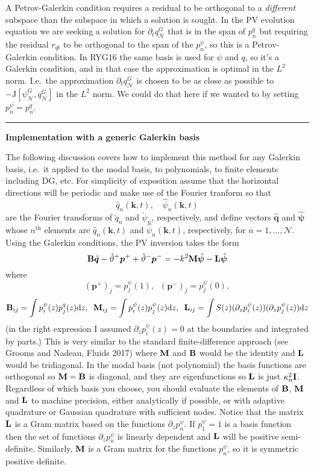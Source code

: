 \documentclass[10pt]{article}
\newcommand{\pd}[1]{\partial_{#1}}
\newcommand{\sN}{\mathcal{N}}
\newcommand{\mat}[1]{\text{\bf #1}}
\begin{document}
A Petrov-Galerkin condition requires a residual to be orthogonal to a {\it different} subspace than the subspace in which a solution is sought.
In the PV evolution equation we are seeking a solution for $\pd{t}q_\sN^G$ that is in the span of $p_n^q$ but requiring the residual $r_{qt}$ to be orthogonal to the span of the $p_n^\psi$, so this is a Petrov-Galerkin condition.
In RYG16 the same basis is used for $\psi$ and $q$, so it's a Galerkin condition, and in that case the approximation is optimal in the $L^2$ norm.
I.e.~the approximation $\pd{t}q_\sN^G$ is chosen to be as close as possible to $-\text{J}[\psi_\sN^G,q_\sN^G]$ in the $L^2$ norm.
We could do that here if we wanted to by setting $p_n^\psi=p_n^q$.

\clearpage
\hrule
\begin{center}{\bf Implementation with a generic Galerkin basis}\end{center}
The following discussion covers how to implement this method for any Galerkin basis, i.e.~it applied to the modal basis, to polynomials, to finite elements including DG, etc.
For simplicity of exposition assume that the horizontal directions will be periodic and make use of the Fourier tranform so that
\[\hat{q}_n(\bm{k},t),\quad\hat{\psi}_n(\bm{k},t)\]
are the Fourier transforms of $\breve q_n$ and $\breve\psi_n$, respectively, and define vectors $\hat{\bm{q}}$ and $\hat{\bm{\psi}}$ whose $n^\text{th}$ elements are $\hat{q}_n(\bm{k},t)$ and $\hat{\psi}_n(\bm{k},t)$, respectively, for $n=1,\ldots,\sN$.
Using the Galerkin conditions, the PV inversion takes the form
\[\mat{B}\hat{\bm{q}} -\hat{\vartheta}^+\bm{p}^++\hat{\vartheta}^-\bm{p}^- = -k^2\mat{M}\hat{\bm{\psi}}-\mat{L}\hat{\bm{\psi}}\]
where
\[\left(\bm{p}^+\right)_j = p_j^\psi(1),\;\;\left(\bm{p}^-\right)_j = p_j^\psi(0),\]
\[\mat{B}_{ij} = \int p_i^\psi(z)p_j^q(z)\text{d}z,\;\;\mat{M}_{ij}=\int p_i^\psi(z)p_j^\psi(z)\text{d}z,\;\;\mat{L}_{ij} = \int S(z)(\pd{z}p_i^\psi(z))(\pd{z}p_j^\psi(z))\text{d}z\]
(in the right expression I assumed $\pd{z}p_i^\psi(z)=0$ at the boundaries and integrated by parts.)
This is very similar to the standard finite-difference approach (see Grooms and Nadeau, Fluids 2017) where $\mat{M}$ and $\mat{B}$ would be the identity and $\mat{L}$ would be tridiagonal.
In the modal basis (not polynomial) the basis functions are orthogonal so $\mat{M}=\mat{B}$ is diagonal, and they are eigenfunctions so $\mat{L}$ is just $\kappa_n^2\mat{I}$.
Regardless of which basis you choose, you should evaluate the elements of $\mat{B}$, $\mat{M}$ and $\mat{L}$ to machine precision, either analytically if possible, or with adaptive quadrature or Gaussian quadrature with sufficient nodes.
Notice that the matrix $\mat{L}$ is a Gram matrix based on the functions $\pd{z}p_n^\psi$.
If $p_1^\psi = 1$ is a basis function then the set of functions $\pd{z}p_n^\psi$ is linearly dependent and $\mat{L}$ will be positive semi-definite.
Similarly, $\mat{M}$ is a Gram matrix for the functions $p_n^\psi$, so it is symmetric positive definite.\\
\end{document}
